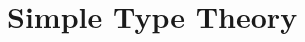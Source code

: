 \documentclass{beamer}
\theoremstyle{indentDefn} \newtheorem{defn}[]{Definition}
\begin{document}










\section{Simple Type Theory}
\end{document}
